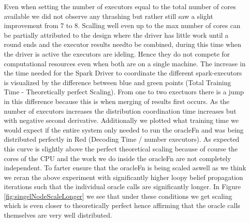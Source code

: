 Even when setting the number of executors equal to the total number of cores available we did not observe any thrashing but rather still saw a slight improvement from 7 to 8. Scalling well even up to the max number of cores can be partially attributed to the design where the driver has little work until a round ends and the executor results needto be combined, during this time when the driver is active the executors are ideling. Hence they do not compete for computational resources even when both are on a single machine. The increase in the time needed for the Spark Driver to coordinate the different spark-executors is visualized by the difference between blue and green points (Total Training Time - Theoretically perfect Scaling). From one to two exectuors there is a jump in this difference because this is when merging of results first occurs. As the number of executors increases the distribution coordination time increases but with negative second derivative. Additionally we plotted what training time we would expect if the entire system only needed to run the oracleFn and was being distributed perfectly in Red (Decoding Time / number executors). As expected this curve is slightly above the perfect theoretical scaling because of course the cores of the CPU and the work we do inside the oracleFn are not completely independent. To farter ensure that the oracleFn is being scaled aswell as we think we reran the above experiment with significantly higher loopy belief propagation iterations such that the individual oracle calls are significantly longer. In Figure \ref{fig:singelNodeScaleLonger} we see that under these conditions we get scaling which is even closer to theoretically perfect hence affirming that the oracle calls themselves are very well distributed. 



